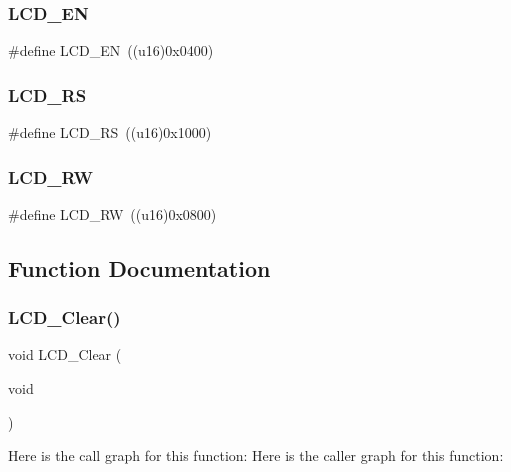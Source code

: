 \mbox{\label{lcd4bit_8h_a1640ffbc0d8ec0f7edb04a2b93918072}} 
\subsubsection{L\+C\+D\+\_\+\+EN}
{\footnotesize\ttfamily \#define L\+C\+D\+\_\+\+EN~((u16)0x0400)}

\mbox{\label{lcd4bit_8h_a4781e073871c6f27f89b9463ad3a4ed1}} 
\subsubsection{L\+C\+D\+\_\+\+RS}
{\footnotesize\ttfamily \#define L\+C\+D\+\_\+\+RS~((u16)0x1000)}

\mbox{\label{lcd4bit_8h_a26089a10ddd59a0dc7283c19ccc02533}} 
\subsubsection{L\+C\+D\+\_\+\+RW}
{\footnotesize\ttfamily \#define L\+C\+D\+\_\+\+RW~((u16)0x0800)}



\subsection{Function Documentation}
\mbox{\label{lcd4bit_8h_ae60d0b62d7eb3fa31266c095d7b3c245}} 
\subsubsection{L\+C\+D\+\_\+\+Clear()}
{\footnotesize\ttfamily void L\+C\+D\+\_\+\+Clear (\begin{DoxyParamCaption}\item[{void}]{ }\end{DoxyParamCaption})}

Here is the call graph for this function\+:
Here is the caller graph for this function\+:
\mbox{\label{lcd4bit_8h_ae5e5bb0b14eca521d8b5f735ec5fa00c}} 
